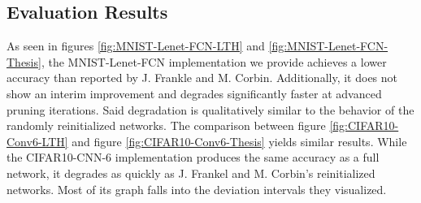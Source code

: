 \subsection*{Evaluation Results}
As seen in figures \ref{fig:MNIST-Lenet-FCN-LTH} and \ref{fig:MNIST-Lenet-FCN-Thesis}, the MNIST-Lenet-FCN implementation we provide achieves a lower accuracy than reported by J. Frankle and M. Corbin. Additionally, it does not show an interim improvement and degrades significantly faster at advanced pruning iterations. Said degradation is qualitatively similar to the behavior of the randomly reinitialized networks.
The comparison between figure \ref{fig:CIFAR10-Conv6-LTH} and figure \ref{fig:CIFAR10-Conv6-Thesis} yields similar results. While the CIFAR10-CNN-6 implementation produces the same accuracy as a full network, it degrades as quickly as J. Frankel and M. Corbin's reinitialized networks. Most of its graph falls into the deviation intervals they visualized.


